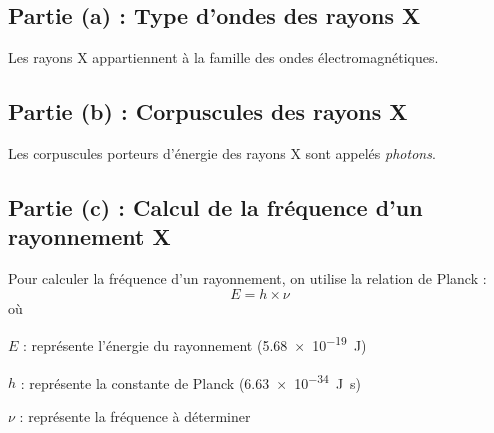 \documentclass[answers]{exam}
\begin{document}
\begin{questions}

\end{questions}



\begin{solution}

\subsection*{Partie (a) : Type d'ondes des rayons X}

Les rayons X appartiennent à la famille des ondes électromagnétiques.

\subsection*{Partie (b) : Corpuscules des rayons X}

Les corpuscules porteurs d'énergie des rayons X sont appelés \emph{photons}.

\subsection*{Partie (c) : Calcul de la fréquence d'un rayonnement X}

Pour calculer la fréquence d'un rayonnement, on utilise la relation de Planck :
\[
E = h \times \nu
\]
où

\begin{addmargin}[4em]{1em}
    \begin{compactitem}
        \item [$E$] : représente l'énergie du rayonnement (\SI{5,68e-19}{\joule})
        \item [$h$] : représente la constante de Planck (\SI{6,63e-34}{\joule\second})
        \item [$\nu$] : représente la fréquence à déterminer
    \end{compactitem}
\end{addmargin}


\end{solution}
\end{document}
